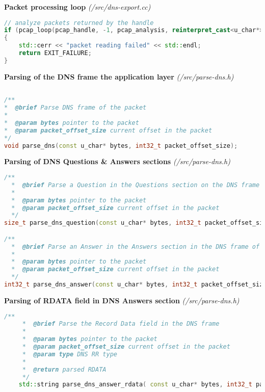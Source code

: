 \vspace{1cm}
\textbf{Packet processing loop} \textit{(/src/dns-export.cc)}
\begin{lstlisting}[language=C++] 
// analyze packets returned by the handle
if (pcap_loop(pcap_handle, -1, pcap_analysis, reinterpret_cast<u_char*>(&link_type)) != 0)
{
    std::cerr << "packet reading failed" << std::endl;
    return EXIT_FAILURE;
}
\end{lstlisting}

\pagebreak

\vspace{1cm}
\textbf{Parsing of the DNS frame the application layer} \textit{(/src/parse-dns.h)}
\begin{lstlisting}[language=C++] 
   
/**
*  @brief Parse DNS frame of the packet
* 
*  @param bytes pointer to the packet
*  @param packet_offset_size current offset in the packet
*/
void parse_dns(const u_char* bytes, int32_t packet_offset_size);

\end{lstlisting}

\vspace{1cm}
\textbf{Parsing of DNS Questions \& Answers sections} \textit{(/src/parse-dns.h)}
\begin{lstlisting}[language=C++] 
/**
  *  @brief Parse a Question in the Questions section on the DNS frame of the packet
  * 
  *  @param bytes pointer to the packet
  *  @param packet_offset_size current offset in the packet
  */
size_t parse_dns_question(const u_char* bytes, int32_t packet_offset_size);

/**
  *  @brief Parse an Answer in the Answers section in the DNS frame of the packet
  * 
  *  @param bytes pointer to the packet
  *  @param packet_offset_size current offset in the packet
  */
int32_t parse_dns_answer(const u_char* bytes, int32_t packet_offset_size);
\end{lstlisting}

\vspace{1cm}
\textbf{Parsing of RDATA field in DNS Answers section} \textit{(/src/parse-dns.h)}
\begin{lstlisting}[language=C++] 
    /**
     *  @brief Parse the Record Data field in the DNS frame 
     * 
     *  @param bytes pointer to the packet
     *  @param packet_offset_size current offset in the packet
     *  @param type DNS RR type 
     *  
     *  @return parsed RDATA
     */
    std::string parse_dns_answer_rdata( const u_char* bytes, int32_t packet_offset_size, uint16_t rdata_length, uint16_t type);
\end{lstlisting}

